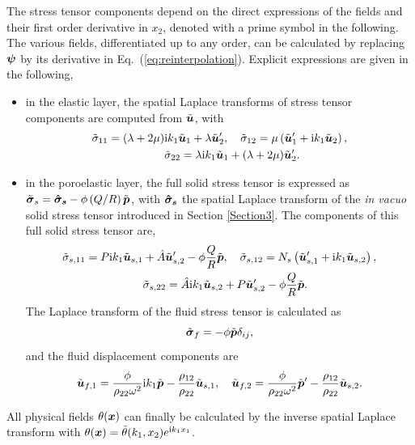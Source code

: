 The stress tensor components depend on the direct expressions of the fields and their first order derivative in $x_2$, denoted with a prime symbol in the following. The various fields, differentiated up to any order, can be calculated by replacing $\boldsymbol \psi$ by its derivative in Eq.~(\ref{eq:reinterpolation}). Explicit expressions are given in the following, 
\begin{itemize}
    \item in the elastic layer, the spatial Laplace transforms of stress tensor components are computed from $\tilde{\boldsymbol u}$, with
    \begin{equation}
    \begin{aligned}
       \tilde \sigma_{11} = (\lambda + 2\mu) &\mathrm i k_1 \tilde {\boldsymbol u}_1 + \lambda \tilde {\boldsymbol u}_2^\prime , \quad \tilde {\sigma}_{12} = \mu \left( \tilde {\boldsymbol u}^\prime_1 + \mathrm i k_1 \tilde {\boldsymbol u}_2\right), \\ &\tilde {\sigma}_{22} = \lambda \mathrm i k_1 \tilde {\boldsymbol u}_1 + (\lambda + 2\mu) \tilde {\boldsymbol u}_2^\prime.
    \end{aligned}
    \end{equation}
    \item in the poroelastic layer, the full solid stress tensor is expressed as $\tilde{\boldsymbol  \sigma}_s = \boldsymbol{\hat \sigma_s} - \phi \left( Q/R \right) \tilde{\boldsymbol p}$, with $\boldsymbol{\hat \sigma_s}$ the spatial Laplace transform of the \emph{in vacuo} solid stress tensor introduced in Section \ref{Section3}. The components of this full solid stress tensor are, 
    \begin{equation}
    \begin{aligned}
    \tilde {\sigma}_{s, 11} =  P \mathrm i k_1 \tilde {\boldsymbol u}_{s,1} &+ \hat A \tilde {\boldsymbol u}_{s,2}^{\prime} -  \phi \frac{Q}{R} \tilde {\boldsymbol p}, \quad \tilde {\sigma}_{s, 12} = N_s \left( \tilde {\boldsymbol u}_{s,1}^{ \prime} + \mathrm i k_1 \tilde {\boldsymbol u}_{s,2} \right), \\ &\tilde {\sigma}_{s, 22} = \hat A \mathrm i k_1 \tilde {\boldsymbol u}_{s,2} + P \tilde {\boldsymbol u}_{s,2}^{ \prime} - \phi \frac{Q}{R} \tilde {\boldsymbol p}.
    \end{aligned}
    \end{equation}
    The Laplace transform of the fluid stress tensor is calculated as 
    \begin{equation}
        \tilde {\boldsymbol \sigma}_f = - \phi \tilde {\boldsymbol p} \delta_{i j},
    \end{equation}
    and the fluid displacement components are 
    \begin{equation}
        \tilde {\boldsymbol u}_{f, 1} = \frac{\phi}{\rho_{22}\omega^2} \mathrm i k_1 \tilde {\boldsymbol p} - \frac{\rho_{12}}{\rho_{22}} \tilde {\boldsymbol u}_{s, 1}, \quad
        \tilde {\boldsymbol u}_{f, 2} = \frac{\phi}{\rho_{22}\omega^2} 
        \tilde {\boldsymbol p}^{\prime} - \frac{\rho_{12}}{\rho_{22}} \tilde {\boldsymbol u}_{s, 2}.
    \end{equation}
\end{itemize}
All physical fields $\theta(\boldsymbol x)$ can finally be calculated by the inverse spatial Laplace transform with $\theta(\boldsymbol x)=\tilde \theta(k_1,x_2)e^{\textrm{i} k_1 x_1} $. 
 
